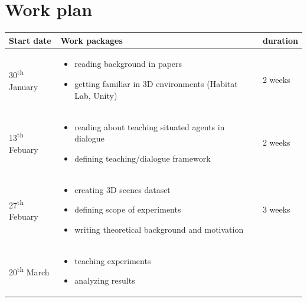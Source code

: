 \documentclass[
	11pt, %
]{fphw}
\begin{document}
\section*{Work plan}
\begin{longtable}{ | m{4cm} | m{7cm} | m{3cm} | }
	\hline
	\textbf{Start date}            & \textbf{Work packages}                                   & \textbf{duration} \\
	\hline
	\hline
	30\textsuperscript{th} January
	                               & \begin{itemize}
		                                 \item reading background in papers
		                                 \item getting familiar in 3D environments
		                                       (Habitat Lab, Unity)
	                                 \end{itemize}
	                               & 2 weeks                                                                      \\
	\hline
	13\textsuperscript{th} Febuary
	                               & \begin{itemize}
		                                 \item reading about teaching situated agents in dialogue
		                                 \item defining teaching/dialogue framework
	                                 \end{itemize}
	                               & 2 weeks                                                                      \\
	\hline
	27\textsuperscript{th} Febuary & \begin{itemize}
		                                 \item creating 3D scenes dataset
		                                 \item defining scope of experiments
		                                 \item writing theoretical background and motivation
	                                 \end{itemize}      & 3 weeks                           \\
	\hline
	20\textsuperscript{th} March   & \begin{itemize}
		                                 \item teaching experiments
		                                 \item analyzing results

\end{itemize}
\end{longtable}
\end{document}
